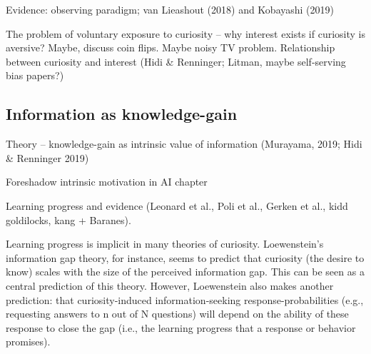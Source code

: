         Evidence: observing paradigm; van Lieashout (2018) and Kobayashi (2019)

        The problem of voluntary exposure to curiosity -- why interest exists if curiosity is aversive? Maybe, discuss coin flips. Maybe noisy TV problem. Relationship between curiosity and interest (Hidi & Renninger; Litman, maybe self-serving bias papers?)

    \subsection{Information as knowledge-gain}

        Theory -- knowledge-gain as intrinsic value of information (Murayama, 2019; Hidi & Renninger 2019)

        Foreshadow intrinsic motivation in AI chapter

        Learning progress and evidence (Leonard et al., Poli et al., Gerken et al., kidd goldilocks, kang + Baranes).

        Learning progress is implicit in many theories of curiosity. Loewenstein's information gap theory, for instance, seems to predict that curiosity (the desire to know) scales with the size of the perceived information gap. This can be seen as a central prediction of this theory. However, Loewenstein also makes another prediction: that curiosity-induced information-seeking response-probabilities (e.g., requesting answers to n out of N questions) will depend on the ability of these response to close the gap (i.e., the learning progress that a response or behavior promises).

